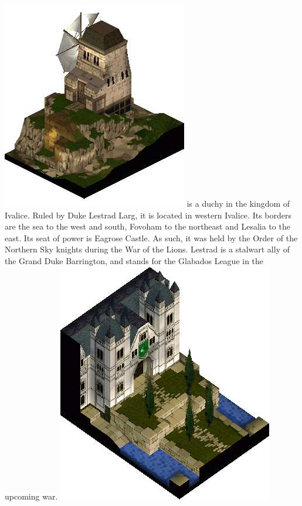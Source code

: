 \includegraphics[width=\columnwidth]{./art/worldbook/fovohamplains.jpg}
\newpage
%
 is a duchy in the kingdom of Ivalice. 
Ruled by Duke Lestrad Larg, it is located in western Ivalice. 
Its borders are the sea to the west and south, Fovoham to the northeast and Lesalia to the east.
Its seat of power is Eagrose Castle. 
As such, it was held by the Order of the Northern Sky knights during the War of the Lions. 
Lestrad is a stalwart ally of the Grand Duke Barrington, and stands for the Glabados League in the upcoming war.
%
\vfill
\includegraphics[width=\columnwidth]{./art/worldbook/belouveresidence.jpg}
